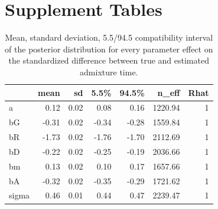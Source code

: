 \documentclass[11pt]{article}
\begin{document}
\section{Supplement Tables}

\begin{table}[H]

\caption{\label{tab:tableS1} Mean, standard deviation, 5.5/94.5 compatibility interval of the posterior distribution for every parameter effect on the standardized difference between true and estimated admixture time.}
\centering
\begin{tabular}{l|r|r|r|r|r|r}
\hline
  & mean & sd & 5.5\% & 94.5\% & n\_eff & Rhat\\
\hline
a & 0.12 & 0.02 & 0.08 & 0.16 & 1220.94 & 1\\
\cline{1-7}
bG & -0.31 & 0.02 & -0.34 & -0.28 & 1559.84 & 1\\
\cline{1-7}
bR & -1.73 & 0.02 & -1.76 & -1.70 & 2112.69 & 1\\
\cline{1-7}
bD & -0.22 & 0.02 & -0.25 & -0.19 & 2036.66 & 1\\
\cline{1-7}
bm & 0.13 & 0.02 & 0.10 & 0.17 & 1657.66 & 1\\
\cline{1-7}
bA & -0.32 & 0.02 & -0.35 & -0.29 & 1721.62 & 1\\
\cline{1-7}
sigma & 0.46 & 0.01 & 0.44 & 0.47 & 2239.47 & 1\\
\hline
\end{tabular}
\end{table}
\end{document}
